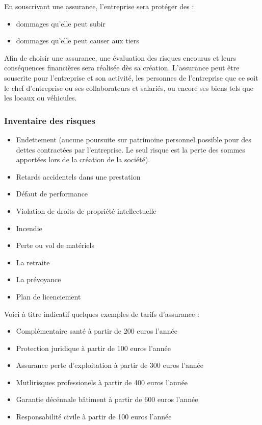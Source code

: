 \documentclass[11pt]{article}
\begin{document}
En souscrivant une assurance, l'entreprise sera protéger des :
\begin{itemize}
	\item dommages qu'elle peut subir
	\item dommages qu'elle peut causer aux tiers
\end{itemize} 

Afin de choisir une assurance, une évaluation des risques encourus et leurs conséquences financières sera réalisée dès sa création. L'assurance peut être souscrite pour l'entreprise et son activité, les personnes de l'entreprise que ce soit le chef d'entreprise ou ses collaborateurs et salariés, ou encore ses biens tels que les locaux ou véhicules.\\

\subsubsection{Inventaire des risques}
\label{ssub:inventaire_risques}
\begin{itemize}
	\item Endettement (aucune poursuite sur patrimoine personnel possible pour des dettes contractées par l'entreprise. Le seul risque est la perte des sommes apportées lors de la création de la société).
	\item Retards accidentels dans une prestation
	\item Défaut de performance
	\item Violation de droits de propriété intellectuelle
	\item Incendie
	\item Perte ou vol de matériels
	\item La retraite
	\item La prévoyance
	\item Plan de licenciement\\
\end{itemize}

Voici à titre indicatif quelques exemples de tarifs d'assurance :
\begin{itemize}
	\item Complémentaire santé à partir de 200 euros l'année
	\item Protection juridique	à partir de 100 euros l'année
	\item Assurance perte d'exploitation à partir de 300 euros l'année
	\item Mutlirisques professionels à partir de 400 euros l'année
	\item Garantie décénnale bâtiment à partir de 600 euros l'année
	\item Responsabilité civile à partir de 100 euros l'année
\end{itemize} 
\end{document}
